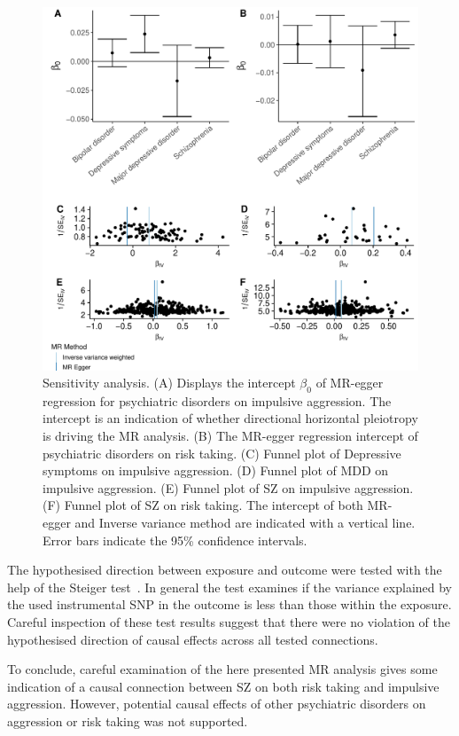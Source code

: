\begin{figure}[htpb]
  \centering
  \includegraphics[width=0.9\linewidth]{ukb_psychiatric/figures/sensitvity_plot.pdf}
  \caption[Sensitivity analysis]{Sensitivity analysis.
    (A) Displays the intercept $\beta_0$ of MR-egger regression for psychiatric disorders on impulsive aggression. The intercept is an indication of whether directional horizontal pleiotropy is driving the MR analysis.
    (B) The MR-egger regression intercept of psychiatric disorders on risk taking.
    (C) Funnel plot of Depressive symptoms on impulsive aggression. 
    (D) Funnel plot of MDD on impulsive aggression. 
    (E) Funnel plot of SZ on impulsive aggression. 
    (F) Funnel plot of SZ on risk taking. 
    The intercept of both MR-egger and Inverse variance method are indicated with a vertical line.
    Error bars indicate the 95\% confidence intervals.
  }\label{fig:sensitivity}
\end{figure}

The hypothesised direction between exposure and outcome were tested with the help of the Steiger test~\cite{Steiger1980}.
In general the test examines if the variance explained by the used instrumental SNP in the outcome is less than those within the exposure. 
Careful inspection of these test results suggest that there were no violation of the hypothesised direction of causal effects across all tested connections.

To conclude, careful examination of the here presented MR analysis gives some indication of a causal connection between SZ on both risk taking and impulsive aggression.
However, potential causal effects of other psychiatric disorders on aggression or risk taking was not supported.

